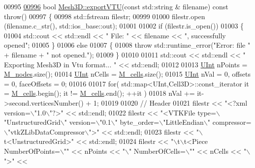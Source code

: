 \begin{DoxyCode}
00995 
\hypertarget{Mesh3D_8cpp_source.tex_l00996}{}\hyperlink{classFVCode3D_1_1Mesh3D_a9c8350dc981d42ba80f37625cf978d3c}{00996} \textcolor{keywordtype}{bool} \hyperlink{classFVCode3D_1_1Mesh3D_a9c8350dc981d42ba80f37625cf978d3c}{Mesh3D::exportVTU}(\textcolor{keyword}{const} std::string & filename) \textcolor{keyword}{const} \textcolor{keywordflow}{throw}()
00997 \{
00998     std::fstream filestr;
00999 
01000     filestr.open (filename.c\_str(), std::ios\_base::out);
01001 
01002     \textcolor{keywordflow}{if} (filestr.is\_open())
01003     \{
01004         std::cout << std::endl << \textcolor{stringliteral}{" File: "} << filename << \textcolor{stringliteral}{", successfully opened"};
01005     \}
01006     \textcolor{keywordflow}{else}
01007     \{
01008         \textcolor{keywordflow}{throw} std::runtime\_error(\textcolor{stringliteral}{"Error: file "} + filename + \textcolor{stringliteral}{" not opened."});
01009     \}
01010 
01011     std::cout << std::endl << \textcolor{stringliteral}{" Exporting Mesh3D in Vtu format... "} << std::endl;
01012 
01013     \hyperlink{namespaceFVCode3D_a4bf7e328c75d0fd504050d040ebe9eda}{UInt} nPoints = \hyperlink{classFVCode3D_1_1Mesh3D_a5464981fd097ce785675d91522884739}{M\_nodes}.size();
01014     \hyperlink{namespaceFVCode3D_a4bf7e328c75d0fd504050d040ebe9eda}{UInt} nCells = \hyperlink{classFVCode3D_1_1Mesh3D_a8cac877e809226fb96078183efb25a2f}{M\_cells}.size();
01015     \hyperlink{namespaceFVCode3D_a4bf7e328c75d0fd504050d040ebe9eda}{UInt} nVal = 0, offsets = 0, faceOffsets = 0;
01016 
01017     \textcolor{keywordflow}{for}( std::map<UInt,Cell3D>::const\_iterator it = \hyperlink{classFVCode3D_1_1Mesh3D_a8cac877e809226fb96078183efb25a2f}{M\_cells}.begin(); it != 
      \hyperlink{classFVCode3D_1_1Mesh3D_a8cac877e809226fb96078183efb25a2f}{M\_cells}.end(); ++it )
01018         nVal += it->second.verticesNumber() + 1;
01019 
01020     \textcolor{comment}{// Header}
01021     filestr << \textcolor{stringliteral}{"<?xml version=\(\backslash\)"1.0\(\backslash\)"?>"} << std::endl;
01022     filestr << \textcolor{stringliteral}{"<VTKFile type=\(\backslash\)"UnstructuredGrid\(\backslash\)" version=\(\backslash\)"0.1\(\backslash\)" byte\_order=\(\backslash\)"LittleEndian\(\backslash\)" compressor=
      \(\backslash\)"vtkZLibDataCompressor\(\backslash\)">"} << std::endl;
01023     filestr << \textcolor{stringliteral}{"\(\backslash\)t<UnstructuredGrid>"} << std::endl;
01024     filestr << \textcolor{stringliteral}{"\(\backslash\)t\(\backslash\)t<Piece NumberOfPoints=\(\backslash\)""} << nPoints << \textcolor{stringliteral}{"\(\backslash\)" NumberOfCells=\(\backslash\)""} << nCells << \textcolor{stringliteral}{"\(\backslash\)">"} << 

\end{DoxyCode}
